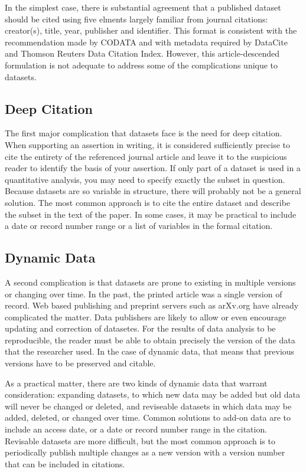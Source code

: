 \documentclass[10pt,a4paper,twocolumn]{article}
\begin{document}
In the simplest case, there is substantial agreement that a published dataset should be cited using five elments largely familiar from journal citations: creator(s), title, year, publisher and identifier. 
This format is consistent with the recommendation made by CODATA\cite{socha_out_2013} and with metadata required by DataCite \cite{datacite_datacite_2013} and Thomson Reuters Data Citation Index. However, this article-descended formulation is not adequate to address some of the complications unique to datasets.

\subsection*{Deep Citation}\label{deep-citation}

The first major complication that datasets face is the need for deep citation. 
When supporting an assertion in writing, it is considered sufficiently precise to cite the entirety of the referenced journal article and leave it to the suspicious reader to identify the basis of your assertion. 
If only part of a dataset is used in a quantitative analysis, you may need to specify exactly the subset in question. 
Because datasets are so variable in structure, there will probably not be a general solution. 
The most common approach is to cite the entire dataset and describe the subset in the text of the paper. 
In some cases, it may be practical to include a date or record number range or a list of variables in the formal citation.

\subsection*{Dynamic Data}\label{dynamic-data}

A second complication is that datasets are prone to existing in multiple versions or changing over time. 
In the past, the printed article was a single version of record.
Web based publishing and preprint servers such as arXv.org have already complicated the matter. 
Data publishers are likely to allow or even encourage updating and correction of datasetes. 
For the results of data analysis to be reproducible, the reader must be able to obtain precisely the version of the data that the researcher used. 
In the case of dynamic data, that means that previous versions have to be preserved and citable.

As a practical matter, there are two kinds of dynamic data that warrant consideration: expanding datasets, to which new data may be added but old data will never be changed or deleted, and reviseable datasets in which data may be added, deleted, or changed over time. 
Common solutions to add-on data are to include an access date, or a date or record number range in the citation. 
Revisable datasets are more difficult, but the most common approach is to periodically publish multiple changes as a new version with a version number that can be included in citations.
\end{document}

